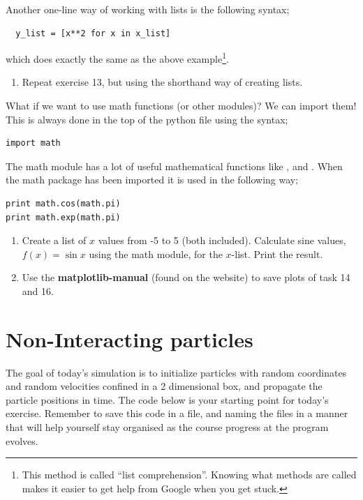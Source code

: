\documentclass{article}
\begin{document}
Another one-line way of working with lists is the following syntax;

\begin{lstlisting}
  y_list = [x**2 for x in x_list]
\end{lstlisting}

which does exactly the same as the above example\footnote{This method is
called ``list comprehension''. Knowing what methods are called makes
it easier to get help from Google when you get stuck. }.

\begin{enumerate}[resume]
  \item Repeat exercise 13, but using the shorthand way of creating lists.
\end{enumerate}

What if we want to use math functions (or other modules)?
We can import them! This is always done in the top of the
python file using the syntax;

\begin{lstlisting}
import math
\end{lstlisting}

The math module has a lot of useful mathematical functions like ,
 and . When the math package has been imported it is used
in the following way;

\begin{lstlisting}
print math.cos(math.pi)
print math.exp(math.pi)
\end{lstlisting}

\begin{enumerate}[resume]
  \item Create a list of $x$ values from -5 to 5 (both included).
    Calculate sine values, $f(x) = \sin{x}$ using the math module,
    for the $x$-list.
    Print the result.
  \item Use the \textbf{matplotlib-manual} (found on the website) to save plots of 
    task 14 and 16.
\end{enumerate}

%
%
%

\newpage
\section{Non-Interacting particles}

The goal of today's simulation is to initialize particles with random coordinates and random velocities confined in a 2 dimensional box, and propagate the particle positions in time.
%
The code below is your starting point for today's exercise. Remember to save this code in a  file, and naming the files in a manner that will help yourself stay organised as the course progress at the program evolves.
\end{document}
